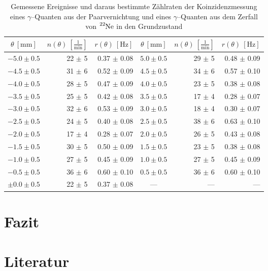 \documentclass[12pt,a4paper]{scrartcl}
\numberwithin{equation}{section} %
\begin{document}
\begin{table}[h!]
	\centering
	\begin{tabular}{c|r|r||c|r|r}
		$\theta\ [\mathrm{mm}]$ & $n(\theta)\ [\frac{1}{\mathrm{min}}]$ & $r(\theta)\ [\mathrm{Hz}]$ &
			$\theta\ [\mathrm{mm}]$ & $n(\theta)\ [\frac{1}{\mathrm{min}}]$ & $r(\theta)\ [\mathrm{Hz}]$ \\
		\hline 
		$-5.0 \pm 0.5$ & 22 $\pm$ 5 & 0.37 $\pm$ 0.08 &
			$5.0 \pm 0.5$ & 29 $\pm$ 5 & 0.48 $\pm$ 0.09 \\
		$-4.5 \pm 0.5$ & 31 $\pm$ 6 & 0.52 $\pm$ 0.09 &
			$4.5 \pm 0.5$ & 34 $\pm$ 6 & 0.57 $\pm$ 0.10 \\
		$-4.0 \pm 0.5$ & 28 $\pm$ 5 & 0.47 $\pm$ 0.09 &
			$4.0 \pm 0.5$ & 23 $\pm$ 5 & 0.38 $\pm$ 0.08 \\
		$-3.5 \pm 0.5$ & 25 $\pm$ 5 & 0.42 $\pm$ 0.08 &
			$3.5 \pm 0.5$ & 17 $\pm$ 4 & 0.28 $\pm$ 0.07 \\
		$-3.0 \pm 0.5$ & 32 $\pm$ 6 & 0.53 $\pm$ 0.09 &
			$3.0 \pm 0.5$ & 18 $\pm$ 4 & 0.30 $\pm$ 0.07 \\
		$-2.5 \pm 0.5$ & 24 $\pm$ 5 & 0.40 $\pm$ 0.08 &
			$2.5 \pm 0.5$ & 38 $\pm$ 6 & 0.63 $\pm$ 0.10 \\
		$-2.0 \pm 0.5$ & 17 $\pm$ 4 & 0.28 $\pm$ 0.07 &
			$2.0 \pm 0.5$ & 26 $\pm$ 5 & 0.43 $\pm$ 0.08 \\
		$-1.5 \pm 0.5$ & 30 $\pm$ 5 & 0.50 $\pm$ 0.09 &
			$1.5 \pm 0.5$ & 23 $\pm$ 5 & 0.38 $\pm$ 0.08 \\
		$-1.0 \pm 0.5$ & 27 $\pm$ 5 & 0.45 $\pm$ 0.09 &
			$1.0 \pm 0.5$ & 27 $\pm$ 5 & 0.45 $\pm$ 0.09 \\
		$-0.5 \pm 0.5$ & 36 $\pm$ 6 & 0.60 $\pm$ 0.10 &
			$0.5 \pm 0.5$ & 36 $\pm$ 6 & 0.60 $\pm$ 0.10 \\
		$\pm 0.0 \pm 0.5$ & 22 $\pm$ 5 & 0.37 $\pm$ 0.08 &---&---&---
	\end{tabular}
	\caption{Gemessene Ereignisse und daraus bestimmte Zählraten der Koinzidenzmessung eines $\gamma$--Quanten aus der Paarvernichtung und eines $\gamma$--Quanten aus dem Zerfall von $\ce{^{22}Ne}$ in den Grundzustand}
	\label{table:messwerte1275}
\end{table}

\clearpage
\hypertarget{fazit}{%
\section{Fazit}\label{fazit}}

\clearpage
\hypertarget{literatur}{%
\section{Literatur}\label{literatur}}
\end{document}
